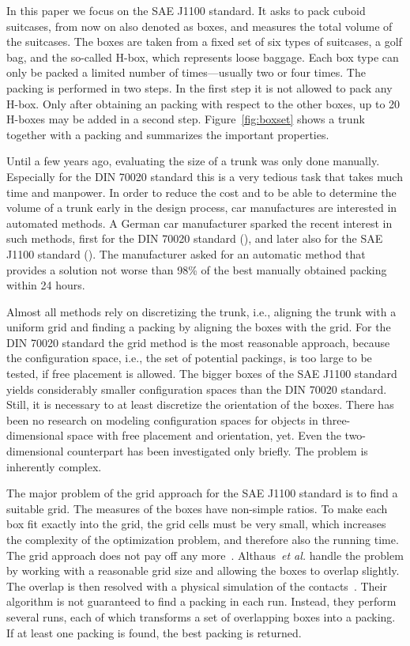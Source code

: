 \documentclass{article}
\newcounter{algo}
\begin{document}
In this paper we focus on the SAE J1100 standard. It asks to pack
cuboid suitcases, from now on also denoted as boxes, and measures the
total volume of the suitcases. The boxes are taken from a fixed set of
six types of suitcases, a golf bag, and the so-called H-box, which
represents loose baggage. Each box type can only be packed a limited
number of times---usually two or four times. The packing is performed
in two steps. In the first step it is not allowed to pack any
H-box. Only after obtaining an packing with respect to the other
boxes, up to 20 H-boxes may be added in a second
step. Figure~\ref{fig:boxset} shows a trunk together with a packing
and summarizes the important properties.

Until a few years ago, evaluating the size of a trunk was only done
manually. Especially for the DIN 70020 standard this is a very tedious
task that takes much time and manpower. In order to reduce the cost
and to be able to determine the volume of a trunk early in the design
process, car manufactures are interested in automated methods. A
German car manufacturer sparked the recent interest in such methods,
first for the DIN 70020 standard
(\cite{efkrs-05,Reichel2003,Karr04,Neum06,Reichel06,Ries05}), and
later also for the SAE J1100 standard (\cite{absw-07,cd-03}). The
manufacturer asked for an automatic method that provides a solution
not worse than 98\% of the best manually obtained packing within 24 hours.

Almost all methods rely on discretizing the trunk, i.e., aligning the
trunk with a uniform grid and finding a packing by aligning the boxes
with the grid. For the DIN 70020 standard the grid method is the most
reasonable approach, because the configuration space, i.e., the set of
potential packings, is too large to be tested, if free placement is
allowed. The bigger boxes of the SAE J1100 standard yields
considerably smaller configuration spaces than the DIN 70020 standard.
Still, it is necessary to at least discretize the orientation of the
boxes. There has been no research on modeling configuration spaces for
objects in three-dimensional space with free placement and
orientation, yet. Even the two-dimensional counterpart has been
investigated only briefly. The problem is inherently complex.

The major problem of the grid approach for the SAE J1100 standard is
to find a suitable grid. The measures of the boxes have non-simple
ratios. To make each box fit exactly into the grid, the grid cells
must be very small, which increases the complexity of the optimization
problem, and therefore also the running time. The grid approach does
not pay off any more~\cite{bsw,Reichel06}. Althaus~\emph{et al.}
handle the problem by working with a reasonable grid size and allowing
the boxes to overlap slightly. The overlap is then resolved with a
physical simulation of the contacts~\cite{bsw}. Their algorithm is not
guaranteed to find a packing in each run. Instead, they perform
several runs, each of which transforms a set of overlapping boxes into
a packing. If at least one packing is found, the best packing is
returned.
\end{document}
